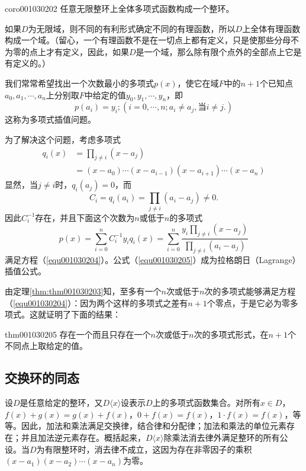 \begin{corollary}{}{coro001030202}
任意无限整环上全体多项式函数构成一个整环。
\end{corollary}

如果$D$为无限域，则不同的有利形式确定不同的有理函数，所以$D$上全体有理函数构成一个域。（留心，一个有理函数不是在一切点上都有定义，只是使那些分母不为零的点上才有定义，因此，如果$D$是一个域，那么除有限个点外的全部点上它是有定义的。）

我们常常希望找出一个次数最小的多项式$p(x)$，使它在域$F$中的$n+1$个已知点$a_0,a_1,\cdots,a_n$上分别取$F$中给定的值$y_0,y_1,\cdots,y_n$，即
\begin{equation}\label{equ001030204}
p(a_i) = y_i;(i=0,\cdots,n;a_i \neq a_j,\text{当}i\neq j.)
\end{equation}
这称为多项式插值问题。

为了解决这个问题，考虑多项式
\[
\begin{aligned}
q_i(x) &= \prod_{j \neq i}{(x-a_j)}\\
&=(x-a_0)\cdots(x-a_{i-1})(x-a_{i+1})\cdots(x-a_n)
\end{aligned}
\]
显然，当$j \neq i$时，$q_i(a_j)=0$，而
\[
C_i=q_i(a_i) = \prod_{j \neq i}{(a_i - a_j)} \neq 0.
\]
因此$C_i^{-1}$存在，并且下面这个次数为$n$或低于$n$的多项式
\begin{equation}\label{equ001030205}
p(x)=\sum_{i=0}^{n}{C_i^{-1}y_iq_i(x)}=\sum_{i=0}^{n}{\frac{y_i\prod_{j \neq i}{(x-a_j)}}{\prod_{j \neq i}{(a_i - a_j)}}}
\end{equation}
满足方程（\ref{equ001030204}）。公式（\ref{equ001030205}）成为拉格朗日（Lagrange）插值公式。

由定理\ref{thm:thm001030203}知，至多有一个$n$次或低于$n$次的多项式能够满足方程（\ref{equ001030204}）：因为两个这样的多项式之差有$n+1$个零点，于是它必为零多项式。这就证明了下面的结果：
\begin{theorem}{}{thm001030205}
存在一个而且只存在一个$n$次或低于$n$次的多项式形式，在$n+1$个不同点上取给定的值。
\end{theorem}



\subsection{交换环的同态}\label{subsection0010303}
设$D$是任意给定的整环，又$D\langle{}x\rangle$设表示$D$上的多项式函数集合。对所有$x \in D$，$f(x)+g(x)=g(x)+f(x)$，$0+f(x)=f(x)$，$1 \cdot f(x)=f(x)$，等等。因此，加法和乘法满足交换律，结合律和分配律；加法和乘法的单位元素存在；并且加法逆元素存在。概括起来，$D\langle{}x\rangle$除乘法消去律外满足整环的所有公设。当$D$为有限整环时，消去律不成立，这因为存在非零因子的乘积$(x-a_1)(x-a_2)\cdots(x-a_n)$为零。

